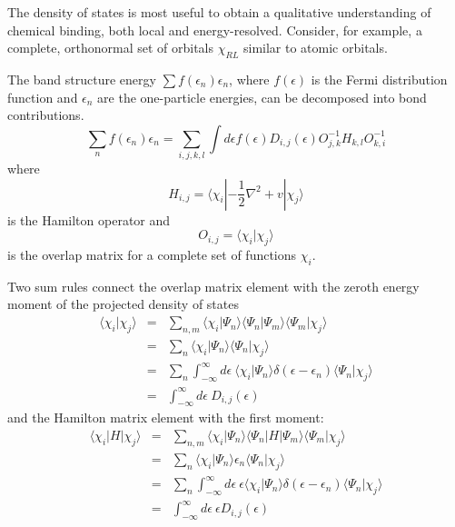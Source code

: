 \documentclass[final,12pt]{article}
\begin{document}
{The density of states is most useful to obtain a qualitative
understanding of chemical binding, both local and energy-resolved.
Consider, for example, a complete, orthonormal set of orbitals
$\chi_{RL}$ similar to atomic orbitals.

The band structure energy $\sum f(\epsilon_n)\epsilon_n$, where
$f(\epsilon)$ is the Fermi distribution function and $\epsilon_n$ are
the one-particle energies, can be decomposed into bond
contributions. 
\begin{equation}
\sum_n f(\epsilon_n)\epsilon_n 
= \sum_{i,j,k,l} \int d\epsilon f(\epsilon)
D_{i,j}(\epsilon) O^{-1}_{j,k} H_{k,l}O^{-1}_{k,i}
\end{equation}
where 
\begin{equation}
H_{i,j}=\langle\chi_i|-\frac{1}{2}\nabla^2+v|\chi_j\rangle
\end{equation}
is the Hamilton operator and 
\begin{equation}
O_{i,j}=\langle\chi_i|\chi_j\rangle
\end{equation}
is the overlap matrix for a complete set of functions $\chi_i$.

Two sum rules connect the overlap matrix element
with the zeroth energy moment of the projected density of states
\begin{eqnarray*}
\langle\chi_i|\chi_j\rangle&=&\sum_{n,m}
\langle\chi_i|\Psi_n\rangle\langle\Psi_n|\Psi_m\rangle\langle\Psi_m|\chi_j\rangle
\\
&=&\sum_{n}\langle\chi_i|\Psi_n\rangle   \langle\Psi_n|\chi_j\rangle
\\
&=&\sum_{n}\int_{-\infty}^{\infty} d\epsilon\ 
\langle\chi_i|\Psi_n\rangle\delta(\epsilon-\epsilon_n)
\langle\Psi_n|\chi_j\rangle
\\
&=&\int_{-\infty}^{\infty} d\epsilon\  D_{i,j}(\epsilon)
\end{eqnarray*}
and the Hamilton matrix element with the first moment:
\begin{eqnarray*}
\langle\chi_i|H|\chi_j\rangle&=&\sum_{n,m}
\langle\chi_i|\Psi_n\rangle\langle\Psi_n|H|\Psi_m\rangle\langle\Psi_m|\chi_j\rangle
\\
&=&\sum_{n}\langle\chi_i|\Psi_n\rangle  \epsilon_n \langle\Psi_n|\chi_j\rangle
\\
&=&\sum_{n}\int_{-\infty}^{\infty} d\epsilon\ \epsilon
\langle\chi_i|\Psi_n\rangle\delta(\epsilon-\epsilon_n)
\langle\Psi_n|\chi_j\rangle
\\
&=&\int_{-\infty}^{\infty} d\epsilon\ \epsilon D_{i,j}(\epsilon)
\end{eqnarray*}

}
\end{document}
